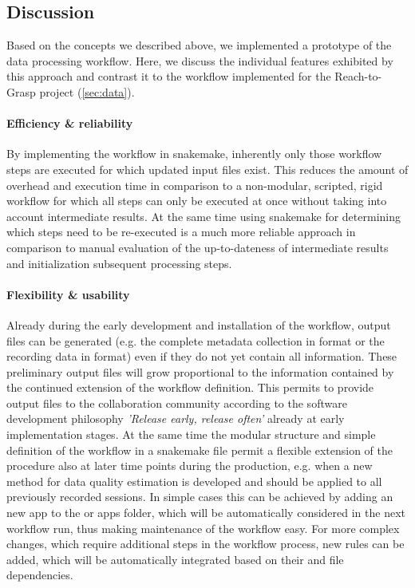 \subsection{Discussion}
Based on the concepts we described above, we implemented a prototype of the data processing workflow. Here, we discuss the individual features exhibited by this approach and contrast it to the workflow implemented for the Reach-to-Grasp project (\cref{sec:data}).

\label{sec:workflow_discussion}
\paragraph{Efficiency \& reliability}
By implementing the workflow in snakemake, inherently only those workflow steps are executed for which updated input files exist. This reduces the amount of overhead and execution time in comparison to a non-modular, scripted, rigid workflow for which all steps can only be executed at once without taking into account intermediate results.
At the same time using snakemake for determining which steps need to be re-executed is a much more reliable approach in comparison to manual evaluation of the up-to-dateness of intermediate results and initialization subsequent processing steps.

\paragraph{Flexibility \& usability}
Already during the early development and installation of the workflow, output files can be generated (e.g. the complete metadata collection in  format or the recording data in  format) even if they do not yet contain all information. These preliminary output files will grow proportional to the information contained by the continued extension of the workflow definition. This permits to provide output files to the collaboration community according to the software development philosophy \textit{'Release early, release often'} \citep{Martin_2008} already at early implementation stages. At the same time the modular structure and simple definition of the workflow in a snakemake file permit a flexible extension of the procedure also at later time points during the production, e.g. when a new method for data quality estimation is developed and should be applied to all previously recorded sessions. In simple cases this can be achieved by adding an new app to the  or  apps folder, which will be automatically considered in the next workflow run, thus making maintenance of the workflow easy. For more complex changes, which require additional steps in the workflow process, new rules can be added, which will be automatically integrated based on their  and  file dependencies.


